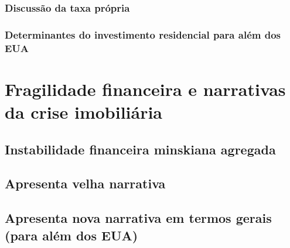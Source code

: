 \documentclass[11pt]{article}
\begin{document}
\subsubsection{Discussão da taxa própria}
\label{sec:orga5a2a17}



\subsubsection{Determinantes do investimento residencial para além dos EUA}
\label{sec:org4b1b6af}






\section{Fragilidade financeira e narrativas da crise imobiliária}
\label{sec:org098bdf8}

\subsection{Instabilidade financeira minskiana agregada}
\label{sec:org2165d40}








\subsection{Apresenta velha narrativa}
\label{sec:org33e2c42}



\subsection{Apresenta nova narrativa em termos gerais (para além dos EUA)}
\label{sec:org4bc75d2}

\end{document}
